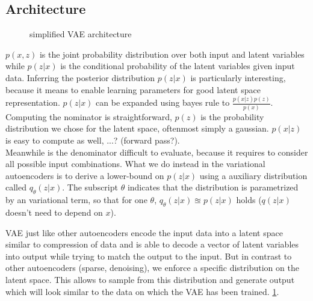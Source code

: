 


\subsection{Architecture}
\label{sub:vae_architecture}

\begin{figure}[t]
  \centering
  
  \caption{simplified VAE architecture}
  \label{fig:vae_architecture}
\end{figure}

$p(x,z)$ is the joint probability distribution over both input and latent variables while $p(z|x)$ is the conditional probability of the latent variables given input data.
Inferring the posterior distribution $p(z|x)$ is particularly interesting, because it means to enable learning parameters for good latent space representation.
$p(z|x)$ can be expanded using bayes rule to $\frac{p(x|z) p(z)}{p(x)}$.
Computing the nominator is straightforward, $p(z)$ is the probability distribution we chose for the latent space, oftenmost simply a gaussian.
$p(x|z)$ is easy to compute as well, ...? (forward pass?).\\
Meanwhile is the denominator difficult to evaluate, because it requires to consider all possible input combinations.
What we do instead in the variational autoencoders is to derive a lower-bound on $p(z|x)$ using a auxiliary distribution called $q_\theta(z|x)$. The subscript $\theta$ indicates that the distribution is parametrized by an variational term, so that for one $\theta$, $q_\theta(z|x) \approxeq p(z|x)$ holds ($q(z|x)$ doesn't need to depend on $x$).

VAE just like other autoencoders encode the input data into a latent space similar to compression of data and is able to decode a vector of latent variables into output while trying to match the output to the input.
But in contrast to other autoencoders (sparse, denoising), we enforce a specific distribution on the latent space.
This allows to sample from this distribution and generate output which will look similar to the data on which the VAE has been trained.
\ref{fig:vae_architecture}.

